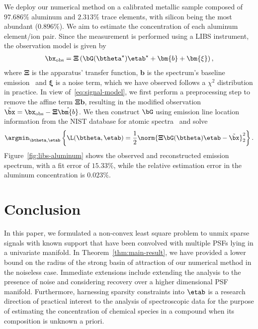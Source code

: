 \documentclass[conference,english,final,svgnames]{IEEEtran}
\begin{document}
We deploy our numerical method on a calibrated metallic sample composed of $97.686\%$ aluminum and $2.313\%$ trace elements, with silicon being the most abundant ($0.896\%$). We aim to estimate the concentration of each aluminum element/ion pair. Since the measurement is performed using a LIBS instrument, the observation model is given by 
\begin{align}
    \bx_{\mathrm{obs}} = \mathbf{\Xi}\left(\bG(\btheta^{\star})\etab^{\star} + \bm{b} + \bm{\xi}\right),
\end{align}
where $\mathbf{\Xi}$ is the apparatus' transfer function, $\bm{b}$ is the spectrum's baseline emission~\cite{baseline-removal} and $\bm{\xi}$ is a noise term, which we have observed follows a $\chi^2$ distribution in practice.
In view of~\eqref{eq:signal-model}, we first perform a preprocessing step to remove the affine term $\mathbf{\Xi}\bm{b}$, resulting in the modified observation $\tilde{\bx} = \bx_{\mathrm{obs}} - \mathbf{\Xi}\hat{\bm{b}}$. We then construct $\bG$ using emission line location information from the NIST database for atomic spectra~\cite{NIST_ASD} and solve
\begin{align}
    \argmin_{\btheta, \etab} \left\{\L(\btheta, \etab) = \frac{1}{2} \norm{\mathbf{\Xi}\bG(\btheta)\etab - \tilde{\bx}}_2^2 \right\}.
\end{align}
Figure~\ref{fig:libs-aluminum} shows the observed and reconstructed emission spectrum, with a fit error of $15.33\%$, while the relative estimation error in the aluminum concentration is $0.023\%$.

\section{Conclusion}\label{sec:conclusion}

In this paper, we formulated a non-convex least square problem to unmix sparse signals with known support that have been convolved with multiple PSFs lying in a univariate manifold. In Theorem~\ref{thm:main-result}, we have provided a lower bound on the radius of the strong basin of attraction of our numerical method in the noiseless case. Immediate extensions include extending the analysis to the presence of noise and considering recovery over a higher dimensional PSF manifold. Furthermore, harnessing sparsity constraints into $\etab$ is a research direction of practical interest to the analysis of spectroscopic data for the purpose of estimating the concentration of chemical species in a compound when its composition is unknown a priori.  

\clearpage
{}
\renewcommand*{\bibfont}{\footnotesize}
\printbibliography
\end{document}
